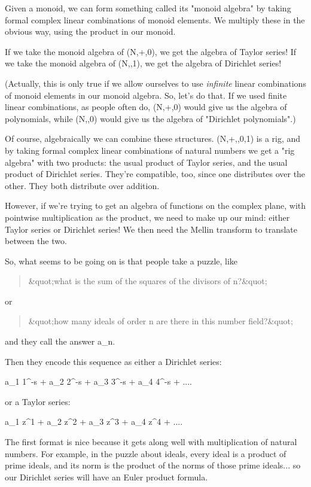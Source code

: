 Given a monoid, we can form something called its "monoid algebra" by taking 
formal complex linear combinations of monoid elements.  We multiply these 
in the obvious way, using the product in our monoid.

If we take the monoid algebra of (N,+,0), we get the algebra of Taylor 
series!  If we take the monoid algebra of (N,\times ,1), we get the algebra of 
Dirichlet series!  

(Actually, this is only true if we allow ourselves to use \emph{infinite} 
linear 
combinations of monoid elements in our monoid algebra.  So, let's do that.  
If we used finite linear combinations, as people often do, (N,+,0) would give 
us the algebra of polynomials, while (N,\times ,0) would give us the algebra of 
"Dirichlet polynomials".)

Of course, algebraically we can combine these structures.  (N,+,\times ,0,1) is 
a rig, and by taking formal complex linear combinations of natural numbers 
we get a "rig algebra" with two products: the usual product of Taylor series, 
and the usual product of Dirichlet series.  They're compatible, too, since 
one distributes over the other.  They both distribute over addition.

However, if we're trying to get an algebra of functions on the complex plane, 
with pointwise multiplication as the product, we need to make up our mind: 
either Taylor series or Dirichlet series!  We then need the Mellin transform 
to translate between the two.

So, what seems to be going on is that people take a puzzle, like 

\begin{quote}
&quot;what is the sum of the squares of the divisors of n?&quot;
\end{quote}
    

or 
\begin{quote}
&quot;how many ideals of order n are there in this number field?&quot;
\end{quote}
    

and they call the answer a_{n}.  

Then they encode this sequence as either a Dirichlet series:

a_{1} 1^{-s} + a_{2} 2^{-s} + a_{3} 3^{-s} + a_{4} 4^{-s} + ....

or a Taylor series:

a_{1} z^{1} + a_{2} z^{2} + a_{3} z^{3} + a_{4} z^{4} + ....

The first format is nice because it gets along well with multiplication of 
natural numbers.  For example, in the puzzle about ideals,
every ideal is a product of prime ideals, and its norm is 
the product of the norms of those prime ideals... so our Dirichlet series 
will have an Euler product formula.

